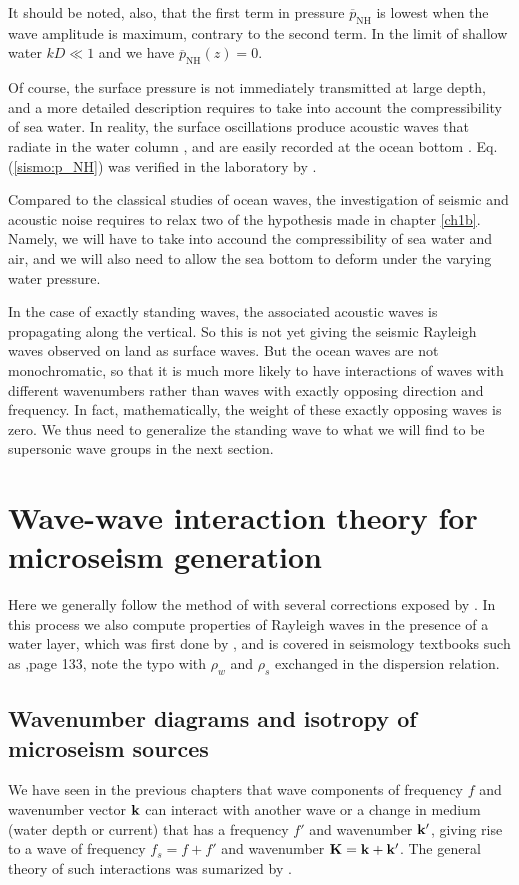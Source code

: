 It should be noted, also, that the first term in pressure $\overline{p}_{\mathrm{NH}}$ is lowest when the wave amplitude is maximum, contrary to the second term. 
In the limit of shallow water $kD \ll 1$ and we have $\overline{p}_{\mathrm{NH}}(z) = 0$.  

Of course, the surface pressure is not immediately transmitted at large depth, and a more detailed description 
requires to take into account the compressibility of sea water. In reality, the surface oscillations produce acoustic 
waves that radiate in the water column \citep{Longuet-Higgins1950}, and are easily recorded at the ocean bottom \citep{Farrell&Munk2008}. 
Eq. (\ref{sismo:p_NH}) was verified in the laboratory by  \cite{Cooper&Longuet-Higgins1951}. 

Compared to the classical studies of ocean waves, the investigation of seismic and acoustic noise requires to relax two of the hypothesis made in chapter \ref{ch1b}. Namely, 
we will have to take into accound the compressibility of sea water and air, and we will also need to allow the sea bottom to deform under the varying water pressure. 

In the case of exactly standing waves, the associated acoustic waves is propagating along the vertical. So this is not yet giving the seismic Rayleigh waves observed on land as surface waves. But the ocean waves are not monochromatic, so that it is much more likely to have interactions of waves with different wavenumbers rather than waves  with exactly opposing direction and frequency.  In fact, mathematically, the weight of these exactly opposing waves is zero. We thus need to generalize the standing wave to what we will find to be supersonic wave groups in the next section. 


\section{Wave-wave interaction theory for microseism generation}
Here we generally follow the method of \cite{Hasselmann1963c} with several corrections exposed by \cite{Ardhuin&Herbers2013}. 
In this process we also compute properties of Rayleigh waves in the presence of a water layer, which was first done by 
\cite{Stoneley1926}, and is covered in seismology textbooks such as \cite{Lay&Wallace1995},page 133, note the typo with  $\rho_w$ and $\rho_s$ exchanged in the dispersion relation.



\subsection{Wavenumber diagrams and isotropy of microseism sources}
We have seen in the previous chapters that wave components of frequency $f$ and wavenumber vector $\mathbf{k}$ can 
interact with another wave or a change in medium (water depth or current) that has a frequency $f'$ and wavenumber $\mathbf{k^{\prime}}$, giving rise 
to a wave of frequency $f_s=f+f'$ and wavenumber $\mathbf{K}=\mathbf{k}+\mathbf{k^{\prime}}$. The general theory of such interactions was sumarized by \cite{Hasselmann1966}. %

